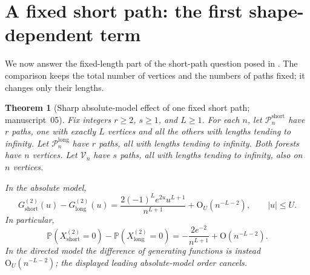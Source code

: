 \documentclass[11pt]{article}
\numberwithin{equation}{section}
\newtheorem{theorem}{Theorem}[section]
\theoremstyle{definition}
\theoremstyle{remark}
\theoremstyle{definition}
\newcommand{\Pp}{\mathbb P}
\newcommand{\bigO}{\mathrm O}
\begin{document}
\section{A fixed short path: the first shape-dependent term}
\label{spf:mg:sec:shortpath}

We now answer the fixed-length part of the short-path question posed in
\cite{mgProveIt}. The comparison keeps the total number of vertices and the
numbers of paths fixed; it changes only their lengths.

\begin{theorem}[Sharp absolute-model effect of one fixed short path; manuscript~05]
\label{spf:mg:thm:shortpath}
Fix integers $r\ge2$, $s\ge1$, and $L\ge1$. For each $n$, let
$\mathcal P_n^{\mathrm{short}}$ have $r$ paths, one with exactly $L$ vertices
and all the others with lengths tending to infinity. Let
$\mathcal P_n^{\mathrm{long}}$ have $r$ paths, all with lengths tending to
infinity. Both forests have $n$ vertices. Let $\mathcal V_n$ have $s$ paths,
all with lengths tending to infinity, also on $n$ vertices.

In the absolute model,
\begin{equation}
 G_{\mathrm{short}}^{(2)}(u)-G_{\mathrm{long}}^{(2)}(u)
 =\frac{2(-1)^Le^{2u}u^{L+1}}{n^{L+1}}
       +\bigO_U(n^{-L-2}),\qquad |u|\le U.
 \label{spf:mg:eq:short-G}
\end{equation}
In particular,
\begin{equation}
 \boxed{\displaystyle
 \Pp(X_{\mathrm{short}}^{(2)}=0)
 -\Pp(X_{\mathrm{long}}^{(2)}=0)
 =-\frac{2e^{-2}}{n^{L+1}}+\bigO(n^{-L-2}).}
 \label{spf:mg:eq:short-avoid}
\end{equation}
In the directed model the difference of generating functions is instead
$\bigO_U(n^{-L-2})$; the displayed leading absolute-model order cancels.
\end{theorem}
\end{document}
